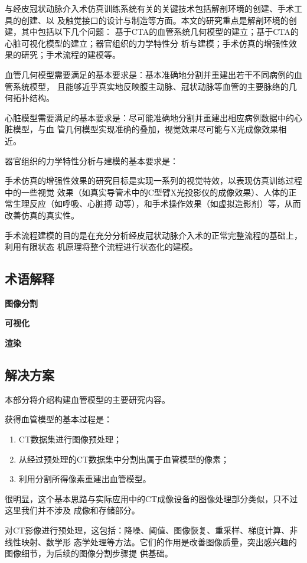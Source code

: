 与经皮冠状动脉介入术仿真训练系统有关的关键技术包括解剖环境的创建、手术工具的创建、以
及触觉接口的设计与制造等方面。本文的研究重点是解剖环境的创建，其中包括以下几个问题：
基于CTA的血管系统几何模型的建立；基于CTA的心脏可视化模型的建立；器官组织的力学特性分
析与建模；手术仿真的增强性效果的研究；手术流程的建模等。

血管几何模型需要满足的基本要求是：基本准确地分割并重建出若干不同病例的血管系统模型，
且能够近乎真实地反映腹主动脉、冠状动脉等血管的主要脉络的几何拓扑结构。

心脏模型需要满足的基本要求是：尽可能准确地分割并重建出相应病例数据中的心脏模型，与血
管几何模型实现准确的叠加，视觉效果尽可能与X光成像效果相近。

器官组织的力学特性分析与建模的基本要求是：

手术仿真的增强性效果的研究目标是实现一系列的视觉特效，以表现仿真训练过程中的一些视觉
效果（如真实导管术中的C型臂X光投影仪的成像效果）、人体的正常生理反应（如呼吸、心脏搏
动等），和手术操作效果（如虚拟造影剂）等，从而改善仿真的真实性。

手术流程建模的目的是在充分分析经皮冠状动脉介入术的正常完整流程的基础上，利用有限状态
机原理将整个流程进行状态化的建模。

\subsection{术语解释}
\label{subsec1-1-2}

\textbf{图像分割}

\textbf{可视化}

\textbf{渲染}

\subsection{解决方案}
\label{subsec1-1-3}

本部分将介绍构建血管模型的主要研究内容。

获得血管模型的基本过程是\cite{Preim2008Review}：
\begin{enumerate}
  \item CT数据集进行图像预处理；
  \item 从经过预处理的CT数据集中分割出属于血管模型的像素；
  \item 利用分割所得像素重建出血管模型。
\end{enumerate}
很明显，这个基本思路与实际应用中的CT成像设备的图像处理部分类似，只不过这里我们并不涉及
成像和存储部分。

对CT影像进行预处理，这包括：降噪、阈值、图像恢复、重采样、梯度计算、非线性映射、数学形
态学处理等方法。它们的作用是改善图像质量，突出感兴趣的图像细节，为后续的图像分割步骤提
供基础。

